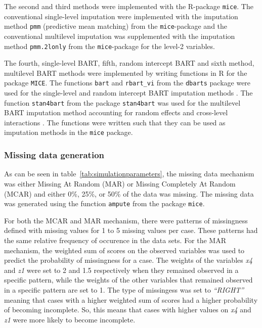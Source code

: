 \documentclass[10pt, a4paper, titlepage]{article}
\begin{document}
The second and third methods were implemented with the R-package \texttt{mice}. The conventional single-level imputation were implemented with the imputation method \texttt{pmm} (predictive mean matching) from the \texttt{mice}-package and the conventional multilevel imputation was supplemented with the imputation method \texttt{pmm.2lonly} from the \texttt{mice}-package for the level-2 variables. 

The fourth, single-level BART, fifth, random intercept BART and sixth method, multilevel BART methods were implemented by writing functions in R \citep{rcoreteam2023} for the package \texttt{MICE}. The functions \texttt{bart} and \texttt{rbart\_vi} from the \texttt{dbarts} package were used for the single-level and random intercept BART imputation methods \citep{dorie2024}. The function \texttt{stan4bart} from the package \texttt{stan4bart} was used for the multilevel BART imputation method accounting for random effects and cross-level interactions \citep{dorie2023a}. The functions were written such that they can be used as imputation methods in the \texttt{mice} package.

\subsubsection{Missing data generation}
As can be seen in table~\ref{tab:simulationparameters}, the missing data mechanism was either Missing At Random (MAR) or Missing Completely At Random (MCAR) and either 0\%, 25\%, or 50\% of the data was missing. The missing data was generated using the function \texttt{ampute} from the package \texttt{mice}.

For both the MCAR and MAR mechanism, there were patterns of missingness defined with missing values for 1 to 5 missing values per case. These patterns had the same relative frequency of occurence in the data sets. For the MAR mechanism, the weighted sum of scores on the observed variables was used to predict the probability of missingness for a case. The weights of the variables \textit{x4} and \textit{z1} were set to 2 and 1.5 respectively when they remained observed in a specific pattern, while the weights of the other variables that remained observed in a specific pattern are set to 1. The type of missingess was set to \textit{``RIGHT''} meaning that cases with a higher weighted sum of scores had a higher probability of becoming incomplete. So, this means that cases with higher values on \textit{x4} and \textit{z1} were more likely to become incomplete.
\end{document}

